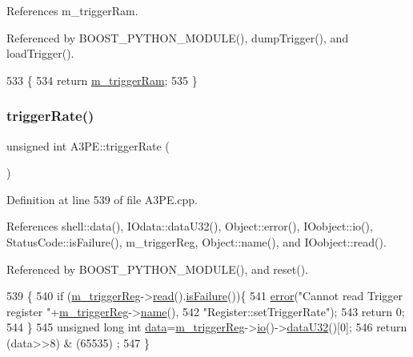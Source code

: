 References m\+\_\+trigger\+Ram.



Referenced by B\+O\+O\+S\+T\+\_\+\+P\+Y\+T\+H\+O\+N\+\_\+\+M\+O\+D\+U\+L\+E(), dump\+Trigger(), and load\+Trigger().


\begin{DoxyCode}
533                    \{
534     \textcolor{keywordflow}{return} \hyperlink{classA3PE_a2b40e3937f0aa008ec7073acc5029fcc}{m\_triggerRam};
535   \}
\end{DoxyCode}
\mbox{\label{classA3PE_ada46375753047d6a74acdec442044f39}} 
\subsubsection{\texorpdfstring{trigger\+Rate()}{triggerRate()}}
{\footnotesize\ttfamily unsigned int A3\+P\+E\+::trigger\+Rate (\begin{DoxyParamCaption}{ }\end{DoxyParamCaption})}



Definition at line 539 of file A3\+P\+E.\+cpp.



References shell\+::data(), I\+Odata\+::data\+U32(), Object\+::error(), I\+Oobject\+::io(), Status\+Code\+::is\+Failure(), m\+\_\+trigger\+Reg, Object\+::name(), and I\+Oobject\+::read().



Referenced by B\+O\+O\+S\+T\+\_\+\+P\+Y\+T\+H\+O\+N\+\_\+\+M\+O\+D\+U\+L\+E(), and reset().


\begin{DoxyCode}
539                               \{
540   \textcolor{keywordflow}{if} (\hyperlink{classA3PE_a750158ae488121ab7969452f061e678c}{m\_triggerReg}->\hyperlink{classIOobject_aa07610c11963b1db6710e3c76ceea456}{read}().\hyperlink{classStatusCode_a5dd22dc6eb2c52fc4cabc58f6dea2eb7}{isFailure}())\{
541     \hyperlink{classObject_a204a95f57818c0f811933917a30eff45}{error}(\textcolor{stringliteral}{"Cannot read Trigger register "}+\hyperlink{classA3PE_a750158ae488121ab7969452f061e678c}{m\_triggerReg}->\hyperlink{classObject_a300f4c05dd468c7bb8b3c968868443c1}{name}(),
542         \textcolor{stringliteral}{"Register::setTriggerRate"});
543     \textcolor{keywordflow}{return} 0;
544   \}
545   \textcolor{keywordtype}{unsigned} \textcolor{keywordtype}{long} \textcolor{keywordtype}{int} \hyperlink{namespaceshell_a5ea2525995cedc3efd69ea8a7f034d1e}{data}=\hyperlink{classA3PE_a750158ae488121ab7969452f061e678c}{m\_triggerReg}->\hyperlink{classIOobject_af04fb94137c3d86849f478ac5afab5d1}{io}()->\hyperlink{classIOdata_ab0e3cd09f46c1c3712f797116f6da074}{dataU32}()[0];
546   \textcolor{keywordflow}{return} (data>>8) & (65535) ; 
547 \}
\end{DoxyCode}
\mbox{\label{classA3PE_a4bf922f391fee6753fb0d53e133603b7}} 

